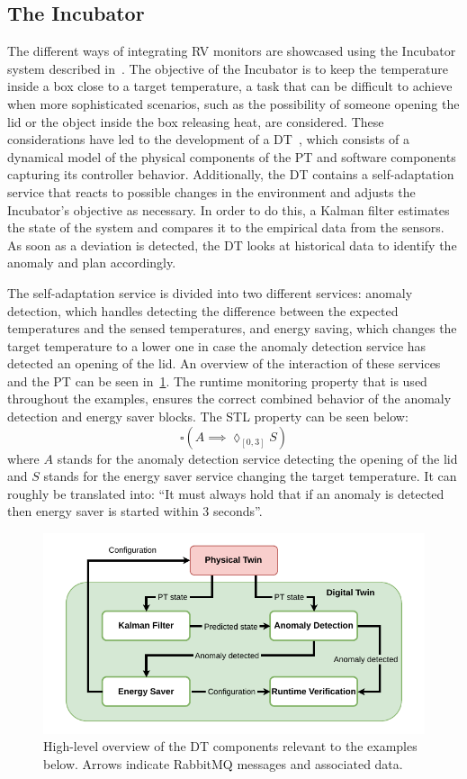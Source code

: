 \subsection{The Incubator}
The different ways of integrating RV monitors are showcased using the Incubator system described in~\cite{Feng&21c}.
The objective of the Incubator is to keep the temperature inside a box close to a target temperature, a task that can be difficult to achieve when more sophisticated scenarios, such as the possibility of someone opening the lid or the object inside the box releasing heat, are considered.
These considerations have led to the development of a DT~\cite{Feng2022}, which consists of a dynamical model of the physical components of the PT and software components capturing its controller behavior. Additionally, the DT contains a self-adaptation service that reacts to possible changes in the environment and adjusts the Incubator's objective as necessary. In order to do this, a Kalman filter estimates the state of the system and compares it to the empirical data from the sensors. As soon as a deviation is detected, the DT looks at historical data to identify the anomaly and plan accordingly.

The self-adaptation service is divided into two different services: anomaly detection, which handles detecting the difference between the expected temperatures and the sensed temperatures, and energy saving, which changes the target temperature to a lower one in case the anomaly detection service has detected an opening of the lid.
An overview of the interaction of these services and the PT can be seen in~\cref{fig:incubator}.
The runtime monitoring property that is used throughout the examples, ensures the correct combined behavior of the anomaly detection and energy saver blocks.
The STL property can be seen below:
\begin{equation}
	\square(A\implies \lozenge_{[0,3]} S)
\end{equation}
where $A$ stands for the anomaly detection service detecting the opening of the lid and $S$ stands for the energy saver service changing the target temperature.
It can roughly be translated into: ``It must always hold that if an anomaly is detected then energy saver is started within 3 seconds''.

\begin{figure}[ht]
	\centering
	\includegraphics[width=\columnwidth]{images/incubator_anomaly_HL.pdf}
	\caption{High-level overview of the DT components relevant to the examples below. Arrows indicate RabbitMQ messages and associated data.}
	\label{fig:incubator}
\end{figure}
